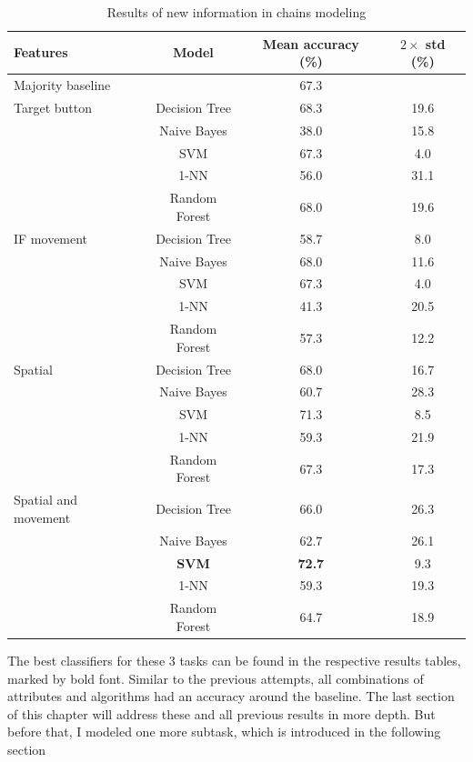 \begin{table}[!htbp]
 \centering
\begin{tabular}{lccc}
\toprule
Features & Model    & Mean accuracy (\%) &  $2\times$ std (\%) \\
\midrule
 Majority baseline  &   & 67.3	& \\
\midrule
Target button 	& Decision Tree 	& 68.3	& 19.6 	\\
				& Naive Bayes  	& 38.0	& 15.8	\\
				& SVM 			& 67.3	& 4.0 	\\
				& 1-NN			& 56.0	& 31.1 	\\
				& Random Forest	& 68.0	& 19.6	\\
\midrule
IF movement	& Decision Tree 	& 	58.7	& 8.0 \\
			& Naive Bayes  	&	68.0	& 11.6	\\
			& SVM 			&	67.3	& 4.0 	\\
			& 1-NN			&	41.3	& 20.5 	\\
			& Random Forest	&	57.3& 12.2 	\\
			
\midrule
Spatial	 	& Decision Tree 	& 68.0	& 16.7 \\
			& Naive Bayes  	& 60.7 	& 28.3	\\
			& SVM 			& 71.3	& 8.5 	\\
			& 1-NN			& 59.3	& 21.9 \\
			& Random Forest	& 67.3	& 17.3 \\	

\midrule
Spatial and movement& Decision Tree 	& 66.0	& 26.3 \\
					& Naive Bayes  	& 62.7	& 26.1	\\
					& \textbf{SVM} 	& \textbf{72.7}	& 9.3 	\\
					& 1-NN			& 59.3	& 19.3 \\
					& Random Forest	& 64.7	& 18.9 \\	 	
\bottomrule
\end{tabular}
\caption{Results of new information in chains modeling}
\label{tab:chains-ml-infgain}
\end{table}

The best classifiers for these 3 tasks can be found in the respective results tables, marked by bold font. Similar to the previous attempts, all combinations of attributes and algorithms had an accuracy around the baseline. The last section of this chapter will address these and all previous results in more depth. But before that, I modeled one more subtask, which is introduced in the following section

